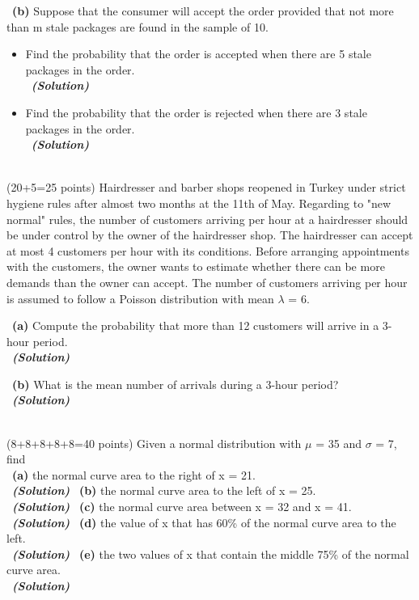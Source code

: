 \documentclass[a4 paper]{article}
\numberwithin{equation}{section}
\newcommand{\problem}[2]{~\\\fbox{\textbf{Problem #1}}\hfill (#2 points)\newline\newline}
\newcommand{\subproblem}[1]{~\newline\textbf{(#1)}}
\newcommand{\solution}{~\newline\textbf{\textit{(Solution)}} }
\newcommand{\0}{\mathbf{0}}
\begin{document}
\subproblem{b} Suppose that the consumer will accept the order provided that not more than m stale packages are found in the sample of 10.
\begin{itemize}
	\item Find the probability that the order is accepted when there are 5 stale packages in the order.\\
	\solution
	\newline
	\item Find the probability that the order is rejected when there are 3 stale packages in the order.\\
	\solution
	\newline
\end{itemize}
\newpage
\problem{2:}{20+5=25}
Hairdresser and barber shops reopened in Turkey under strict hygiene rules after almost two months at the 11th of May. Regarding to "new normal" rules, the number of customers arriving per hour at a hairdresser should be under control by the owner of the hairdresser shop. The hairdresser can accept at most 4 customers per hour with its conditions.
Before arranging appointments with the customers, the owner wants to estimate whether there can be more demands than the owner can accept. The number of customers arriving per hour is assumed to follow
a Poisson distribution with mean $\lambda$ = 6.

\subproblem{a} Compute the probability that more than 12 customers will arrive in a 3-hour period.\\
\solution
\newline

\subproblem{b} What is the mean number of arrivals during a
3-hour period?\\
\solution
\newline

\problem{3:}{8+8+8+8+8=40}
Given a normal distribution with $\mu$ = 35 and $\sigma$ = 7, find\\
\subproblem{a} the normal curve area to the right of x = 21.\\
\solution
\newline
\subproblem{b}  the normal curve area to the left of x = 25.\\
\solution
\newline
\subproblem{c}  the normal curve area between x = 32 and x = 41.\\
\solution
\newline
\subproblem{d} the value of x that has 60\% of the normal curve
area to the left.\\
\solution
\newline
\subproblem{e} the two values of x that contain the middle 75\% of
the normal curve area.\\
\solution
\end{document}
